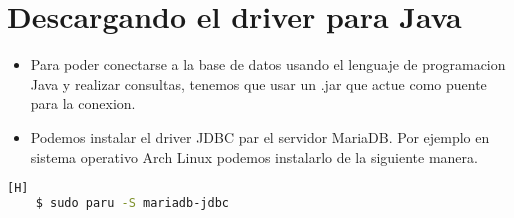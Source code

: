 \section{Descargando el driver para Java}
\begin{itemize}
  \item Para poder conectarse a la base de datos usando el lenguaje de programacion Java y realizar consultas, tenemos que usar un .jar que actue como puente para la conexion.
  \item Podemos instalar el driver JDBC par el servidor MariaDB. Por ejemplo en sistema operativo Arch Linux podemos instalarlo de la siguiente manera.
\end{itemize}

\begin{lstlisting}[language=bash,caption={Descargando el servidor y el cliente MariaDB}][H]
	$ sudo paru -S mariadb-jdbc
\end{lstlisting}

